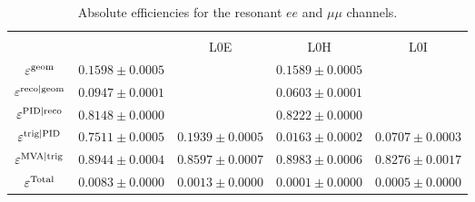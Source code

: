 \begin{table}[h!]
\centering
\caption{Absolute efficiencies for the resonant $ee$ and $\mu\mu$ channels.}
\renewcommand\arraystretch{1.25}
\begin{tabular}{c|c|c|c|c}
\multirow{2}{*}{\boldmath{$\varepsilon$}} 	&  \boldmath{$\mu\mu$} 	& \multicolumn {3}{c}{\boldmath{$ee$}} \\ \cline{2-5}
	  & &  L0E 	& L0H 	& L0I \\ \hline
$\varepsilon^{\rm geom}$  & $ 0.1598  \pm  0.0005 $ & \multicolumn{3}{c}{$ 0.1589  \pm  0.0005 $} \\
$\varepsilon^{\rm reco|geom}$  & $ 0.0947  \pm  0.0001 $ & \multicolumn{3}{c}{$ 0.0603  \pm  0.0001 $} \\
$\varepsilon^{\rm PID|reco}$  & $ 0.8148  \pm  0.0000 $ & \multicolumn{3}{c}{$ 0.8222  \pm  0.0000 $} \\
\hline
$\varepsilon^{\rm trig|PID}$  & $ 0.7511  \pm  0.0005 $ & $ 0.1939  \pm  0.0005 $ & $ 0.0163  \pm  0.0002 $ & $ 0.0707  \pm  0.0003 $ \\
$\varepsilon^{\rm MVA|trig}$   & $ 0.8944  \pm  0.0004 $ & $ 0.8597  \pm  0.0007 $ & $ 0.8983  \pm  0.0006 $ & $ 0.8276  \pm  0.0017 $ \\
\hline
$\varepsilon^{\rm Total}$   & $ 0.0083  \pm  0.0000 $ & $ 0.0013  \pm  0.0000 $ & $ 0.0001  \pm  0.0000 $ & $ 0.0005  \pm  0.0000 $ \\
\end{tabular}
\label{tab:AbsEff_jpsi}
\end{table}


